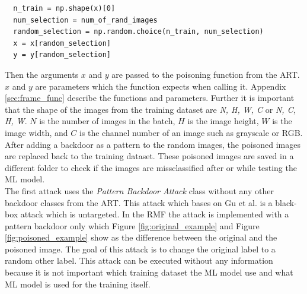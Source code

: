 \begin{lstlisting}
  n_train = np.shape(x)[0]
  num_selection = num_of_rand_images
  random_selection = np.random.choice(n_train, num_selection)
  x = x[random_selection]
  y = y[random_selection]
\end{lstlisting}

Then the arguments $x$ and $y$ are passed to the poisoning function from the ART. $x$ and $y$ are parameters which the function expects when calling it. Appendix \ref{sec:frame_func}
describe the functions and parameters. Further it is important that the shape of the images from the training dataset are \textit{N, H, W, C} or \textit{N, C, H, W}. $N$ is the number of
images in the batch, $H$ is the image height, $W$ is the image width, and $C$ is the channel number of an image such as grayscale or RGB. After adding a backdoor as a pattern to the
random images, the poisoned images are replaced back to the training dataset. These poisoned images are saved in a different folder to check if the images are missclassified after or while
testing the ML model.\\

The first attack uses the \textit{Pattern Backdoor Attack} class without any other backdoor classes from the ART. This attack which bases on Gu et al. \cite{DBLP:journals/corr/abs-1708-06733} is a black-box attack which is untargeted. In the RMF the attack is implemented with a pattern backdoor only which Figure \ref{fig:original_example} and Figure \ref{fig:poisoned_example} show as the
difference between the original and the poisoned image. The goal of this attack is to change the original label to a random other label. This attack can be executed without any
information because it is not important which training dataset the ML model use and what ML model is used for the training itself.

